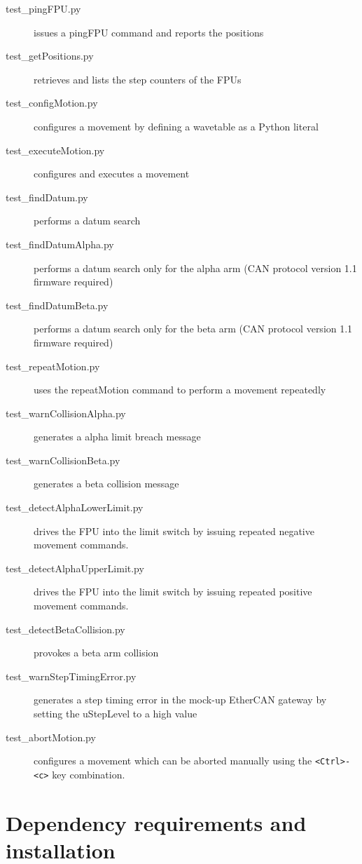\documentclass[11pt,a4paper]{scrartcl}
\begin{document}
\begin{description}
\item[test\_pingFPU.py] issues a pingFPU command and reports the positions
\item[test\_getPositions.py] retrieves and lists the step counters of the FPUs
\item[test\_configMotion.py] configures a movement by defining a wavetable as a Python literal
\item[test\_executeMotion.py] configures and executes a movement
\item[test\_findDatum.py] performs a datum search
\item[test\_findDatumAlpha.py] performs a datum search only for the alpha arm (CAN protocol version 1.1 firmware required)
\item[test\_findDatumBeta.py] performs a datum search only for the beta arm (CAN protocol version 1.1 firmware required)
\item[test\_repeatMotion.py] uses the repeatMotion command to perform a movement repeatedly
\item[test\_warnCollisionAlpha.py] generates a alpha limit breach message
\item[test\_warnCollisionBeta.py] generates a beta collision message
\item[test\_detectAlphaLowerLimit.py] drives the FPU into the limit switch by issuing repeated negative movement commands.
\item[test\_detectAlphaUpperLimit.py] drives the FPU into the limit switch by issuing repeated positive movement commands.
\item[test\_detectBetaCollision.py] provokes a beta arm collision
\item[test\_warnStepTimingError.py] generates a step timing error
  in the mock-up EtherCAN gateway by setting the uStepLevel to a high
  value  
\item[test\_abortMotion.py]  configures a movement which can be aborted
  manually using the \verb+<Ctrl>-<c>+ key combination.
\end{description}

\section{Dependency requirements and installation}
\label{sec:installationfromscratch}
\end{document}
